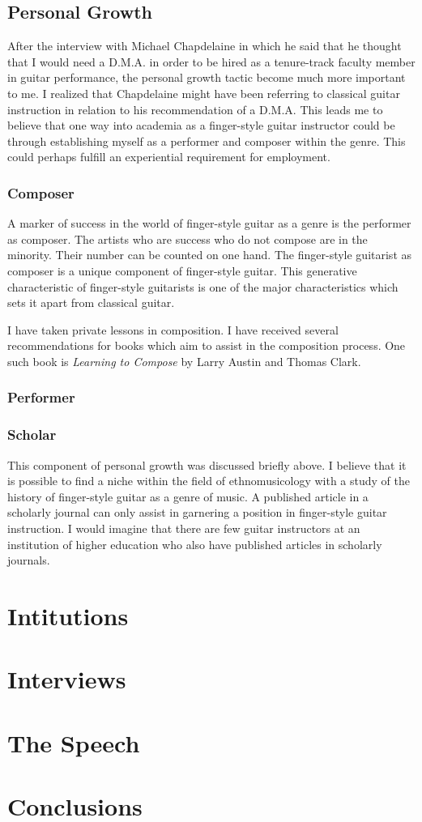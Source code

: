 \documentclass[12pt]{article}
\begin{document}
\subsection{Personal Growth}
\label{sec:personal-growth}
After the interview with Michael Chapdelaine in which he said that he
thought that I would need a D.M.A. in order to be hired as a
tenure-track faculty member in guitar performance, the personal growth
tactic become much more important to me. I realized that Chapdelaine
might have been referring to classical guitar instruction in relation
to his recommendation of a D.M.A. This leads me to believe that one
way into academia as a finger-style guitar instructor could be through
establishing myself as a performer and composer within the genre. This
could perhaps fulfill an experiential requirement for employment.
\subsubsection{Composer}
\label{sec:composer}
A marker of success in the world of finger-style guitar as a genre is
the performer as composer. The artists who are success who do not
compose are in the minority. Their number can be counted on one
hand. The finger-style guitarist as composer is a unique component of
finger-style guitar. This generative characteristic of finger-style
guitarists is one of the major characteristics which sets it apart
from classical guitar.

I have taken private lessons in composition. I have received several
recommendations for books which aim to assist in the composition
process. One such book is \emph{Learning to Compose} by Larry Austin
and Thomas Clark.\autocite{austin1989}
\subsubsection{Performer}
\label{sec:performer}

\subsubsection{Scholar}
\label{sec:scholar}
This component of personal growth was discussed briefly above. I
believe that it is possible to find a niche within the field of
ethnomusicology with a study of the history of finger-style guitar as
a genre of music. A published article in a scholarly journal can only
assist in garnering a position in finger-style guitar instruction. I
would imagine that there are few guitar instructors at an institution
of higher education who also have published articles in scholarly
journals. 
\section{Intitutions}
\label{sec:intitutions}

\section{Interviews}
\label{sec:interviews}

\section{The Speech}
\label{sec:speech}

\section{Conclusions}
\label{sec:conclusions}

\clearpage
\printbibliography
\end{document}
